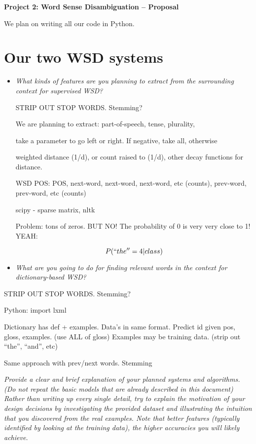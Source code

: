 \documentclass{article}
\begin{document}
\begin{center}\textbf{Project 2: Word Sense Disambiguation -- Proposal}\end{center}

We plan on writing all our code in Python.

\section{Our two WSD systems}

\begin{itemize}
\item \textit{What kinds of features are you planning to extract from the surrounding context for supervised WSD?}\par

STRIP OUT STOP WORDS. Stemming?

We are planning to extract: part-of-speech, tense, plurality, 

take a parameter to go left or right. If negative, take all, otherwise

weighted distance (1/d), or count raised to (1/d), other decay functions for distance.

WSD POS: POS, next-word, next-word, next-word, etc (counts), prev-word, prev-word, etc (counts)

scipy - sparse matrix, nltk

Problem: tons of zeros. BUT NO! The probability of 0 is very very close to 1! YEAH:\par
\[P(``the'' = 4 | class)\]

\item \textit{What are you going to do for finding relevant words in the context for
dictionary-based WSD?}\par
\end{itemize}

STRIP OUT STOP WORDS. Stemming?

Python: import lxml\par
Dictionary has def + examples. Data's in same format. Predict id given pos, gloss, examples. (use ALL of gloss) Examples may be training data. (strip out ``the'', ``and'', etc)

Same approach with prev/next words. Stemming

\textit{Provide a clear and brief explanation of your planned systems and algorithms. (Do not repeat the basic models that are already described in this document) Rather than writing up every single detail, try to explain the motivation of your design decisions by investigating the provided dataset and illustrating the intuition that you discovered from the real examples. Note that better features (typically identified by looking at the training data), the higher accuracies you will likely achieve.}
\end{document}
